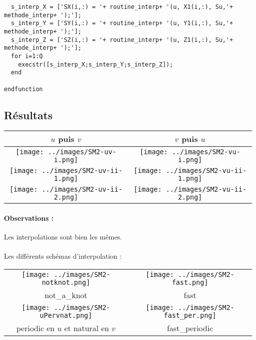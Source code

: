 \documentclass[11pt,a4paper]{article}
\begin{document}
\begin{lstlisting}
  s_interp_X = ['SX(i,:) = '+ routine_interp+ '(u, X1(i,:), Su,'+ methode_interp+ ');'];
  s_interp_Y = ['SY(i,:) = '+ routine_interp+ '(u, Y1(i,:), Su,'+ methode_interp+ ');'];
  s_interp_Z = ['SZ(i,:) = '+ routine_interp+ '(u, Z1(i,:), Su,'+ methode_interp+ ');'];
  for i=1:Q
    execstr([s_interp_X;s_interp_Y;s_interp_Z]);
  end

endfunction
\end{lstlisting}

\subsection{Résultats}

\begin{tabular}{|c|c|}
\hline
$u$ puis $v$                                        & $v$ puis $u$\\
\hline
\texttt{[image: ../images/SM2-uv-i.png]} & \texttt{[image: ../images/SM2-vu-i.png]} \\
\texttt{[image: ../images/SM2-uv-ii-1.png]} & \texttt{[image: ../images/SM2-vu-ii-1.png]} \\
\texttt{[image: ../images/SM2-uv-ii-2.png]} & \texttt{[image: ../images/SM2-vu-ii-2.png]} \\
\hline
\end{tabular}

\paragraph{Observations :} Les interpolations sont bien les mêmes.\\ \\

Les différents schémas d'interpolation :\\
\begin{tabular}{|c|c|}
\hline
\texttt{[image: ../images/SM2-notknot.png]} & \texttt{[image: ../images/SM2-fast.png]} \\
not\_a\_knot                                             & fast \\
\hline
\texttt{[image: ../images/SM2-uPervnat.png]} & \texttt{[image: ../images/SM2-fast\_per.png]} \\
periodic en $u$ et natural en $v$                       & fast\_periodic \\
\hline
\end{tabular}
\end{document}
